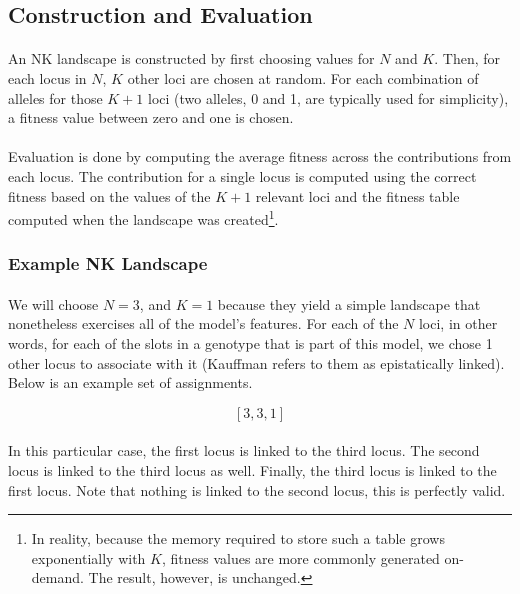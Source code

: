 \documentclass[12pt,letterpaper,titlepage]{article}
\begin{document}
\subsection{Construction and Evaluation}

\paragraph{}
An NK landscape is constructed by first choosing values for $N$ and $K$. Then,
for each locus in $N$, $K$ other loci are chosen at random. For each
combination of alleles for those $K+1$ loci (two alleles, 0 and 1, are
typically used for simplicity), a fitness value between zero and one is chosen.

\paragraph{}
Evaluation is done by computing the average fitness across the contributions
from each locus. The contribution for a single locus is computed using the
correct fitness based on the values of the $K+1$ relevant loci and the fitness
table computed when the landscape was created\footnote{In reality, because the
memory required to store such a table grows exponentially with $K$, fitness
values are more commonly generated on-demand. The result, however, is
unchanged.}.

\subsubsection{Example NK Landscape}

\paragraph{}
We will choose $N=3$, and $K=1$ because they yield a simple landscape that
nonetheless exercises all of the model's features. For each of the $N$ loci, in
other words, for each of the slots in a genotype that is part of this model, we
chose 1 other locus to associate with it (Kauffman refers to them as
epistatically linked). Below is an example set of assignments.

\begin{displaymath}
    \left[3,3,1\right]
\end{displaymath}

\paragraph{}
In this particular case, the first locus is linked to the third locus. The
second locus is linked to the third locus as well. Finally, the third locus is
linked to the first locus. Note that nothing is linked to the second locus,
this is perfectly valid.
\end{document}
